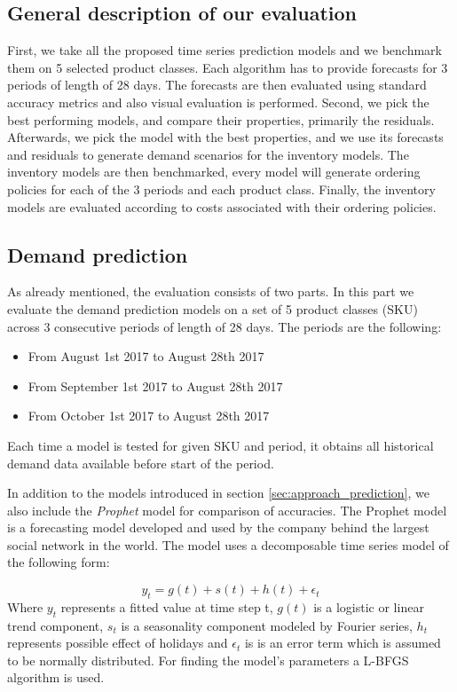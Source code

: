 \documentclass[11pt,a4paper]{article}
\begin{document}
\subsection{General description of our evaluation}
First, we take all the proposed time series prediction models and we benchmark them on 5 selected product classes. Each algorithm has to provide forecasts for 3 periods of length of 28 days. The forecasts are then evaluated using standard accuracy metrics and also visual evaluation is performed. Second, we pick the best performing models, and compare their properties, primarily the residuals.
Afterwards, we pick the model with the best properties, and we use its forecasts and residuals to generate demand scenarios for the inventory models. The inventory models are then benchmarked, every model will generate ordering policies for each of the 3 periods and each product class. Finally, the inventory models are evaluated according to costs associated with their ordering policies.

\subsection{Demand prediction}
\label{sec:dem_eval}
As already mentioned, the evaluation consists of two parts. In this part we evaluate the demand prediction models on a set of 5 product classes (SKU) across 3 consecutive periods of length of 28 days. The periods are the following:
\begin{itemize}
\item From August 1st 2017 to August 28th 2017
\item From September 1st 2017 to August 28th 2017
\item From October 1st 2017 to August 28th 2017
\end{itemize}
Each time a model is tested for given SKU and period, it obtains all historical demand data available before start of the period.

In addition to the models introduced in section \ref{sec:approach_prediction}, we also include the \textit{Prophet}\cite{prophet} model for comparison of accuracies. The Prophet model is a forecasting model developed and used by the company behind the largest social network in the world. The model uses a decomposable time series model of the following form:

\begin{equation}
y_t = g(t) + s(t) + h(t) + \epsilon_t
\end{equation}
Where $y_t$ represents a fitted value at time step t, $g(t)$ is a logistic or linear trend component, $s_t$ is a seasonality component modeled by Fourier series, $h_t$ represents possible effect of holidays and $\epsilon_t$ is is an error term which is assumed to be normally distributed. For finding the model's parameters a L-BFGS \cite{bfgs} algorithm is used.
\end{document}
